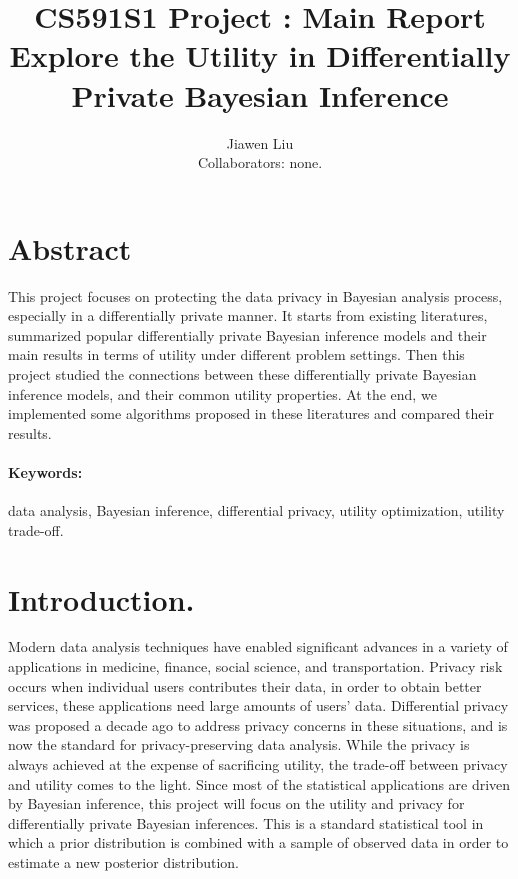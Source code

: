 \documentclass{article}
\begin{document}
\title{
{\textbf{CS591S1 Project
: Main Report}\\
\large{Explore the Utility in Differentially Private Bayesian Inference}}
}
\author{Jiawen Liu\\
Collaborators: none.}

\date{}
\maketitle
\tableofcontents
%   
\newpage
%
\section{Abstract}
This project focuses on protecting the data privacy in Bayesian analysis process, especially in a differentially private manner.
It starts from existing literatures, summarized popular differentially private Bayesian inference models and their main results in terms of utility under different problem settings.
Then this project studied the connections between these differentially private Bayesian inference models,
and their common utility properties. At the end, we implemented some algorithms proposed in these literatures and compared their results.
%
%
%
\paragraph{Keywords:} data analysis, Bayesian inference, differential privacy, utility optimization, utility trade-off.
%
%
\section{Introduction.}
Modern data analysis techniques have enabled significant
advances in a variety of applications in medicine, finance,
social science, and transportation. Privacy risk occurs when individual users contributes their data, in order to obtain better
services, these applications need large amounts of users’ data. 
Differential privacy was proposed a decade ago to address privacy concerns in these situations, and is now the standard for privacy-preserving data analysis.
While the privacy is always achieved at the expense of sacrificing utility, the trade-off between privacy and utility comes to the light.
Since most of the statistical applications are driven by Bayesian inference, this project will focus on the utility and privacy for differentially private Bayesian inferences.
This is a standard statistical tool in which a prior distribution is combined
with a sample of observed data in order to estimate a new posterior distribution.
\end{document}
